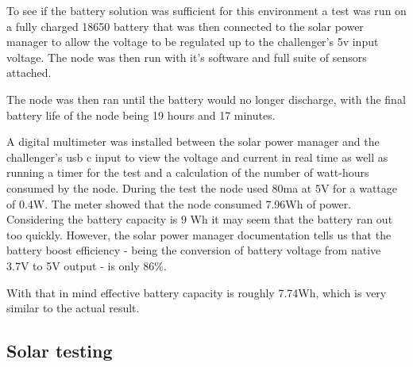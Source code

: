 To see if the battery solution was sufficient for this environment a test
was run on a fully charged 18650 battery that was then connected to the solar
power manager to allow the voltage to be regulated up to the challenger's 5v
input voltage. The node was then run with it's software and full suite of
sensors attached.

The node was then ran until the battery would no longer discharge, with the
final battery life of the node being 19 hours and 17 minutes.

A digital multimeter was installed between the solar power manager and the
challenger's usb c input to view the voltage and current in real time as well as
running a timer for the test and a calculation of the number of watt-hours
consumed by the node. During the test the node used 80ma at 5V for a wattage of
0.4W. The meter showed that the node consumed 7.96Wh of power. Considering the
battery capacity is 9 Wh it may seem that the battery ran out too quickly.
However, the solar power manager documentation tells us that the battery boost
efficiency - being the conversion of battery voltage from native 3.7V to 5V
output - is only 86\%.

With that in mind effective battery capacity is roughly 7.74Wh, which is very
similar to the actual result.

\subsection{Solar testing}

